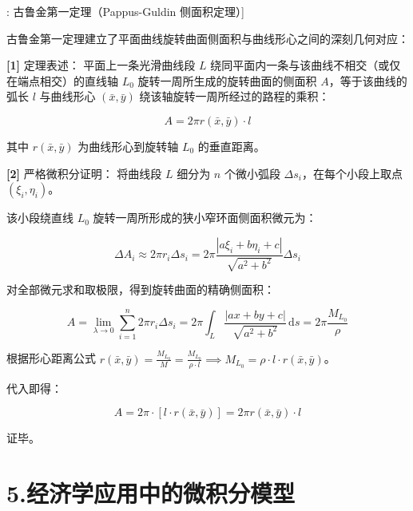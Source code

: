 \documentclass[11pt,a4paper,UTF8]{ctexart}
\begin{document}
\begin{thmbox}[定理[1]: 古鲁金第一定理（Pappus-Guldin 侧面积定理）]

古鲁金第一定理建立了平面曲线旋转曲面侧面积与曲线形心之间的深刻几何对应：

\textbf{[1]} 定理表述：
平面上一条光滑曲线段 $L$ 绕同平面内一条与该曲线不相交（或仅在端点相交）的直线轴 $L_0$ 旋转一周所生成的旋转曲面的侧面积 $A$，等于该曲线的弧长 $l$ 与曲线形心 $(\bar{x}, \bar{y})$ 绕该轴旋转一周所经过的路程的乘积：


\begin{equation*}
A = 2\pi r(\bar{x}, \bar{y}) \cdot l
\end{equation*}


其中 $r(\bar{x}, \bar{y})$ 为曲线形心到旋转轴 $L_0$ 的垂直距离。

\textbf{[2]} 严格微积分证明：
将曲线段 $L$ 细分为 $n$ 个微小弧段 $\Delta s_i$，在每个小段上取点 $(\xi_i, \eta_i)$。

该小段绕直线 $L_0$ 旋转一周所形成的狭小窄环面侧面积微元为：


\begin{equation*}
\Delta A_i \approx 2\pi r_i \Delta s_i = 2\pi \frac{|a \xi_i + b \eta_i + c|}{\sqrt{a^2 + b^2}} \Delta s_i
\end{equation*}


对全部微元求和取极限，得到旋转曲面的精确侧面积：


\begin{equation*}
A = \lim_{\lambda \to 0} \sum_{i=1}^n 2\pi r_i \Delta s_i = 2\pi \int_L \frac{|a x + b y + c|}{\sqrt{a^2 + b^2}}\,\mathrm{d}s = 2\pi \frac{M_{L_0}}{\rho}
\end{equation*}


根据形心距离公式 $r(\bar{x}, \bar{y}) = \frac{M_{L_0}}{M} = \frac{M_{L_0}}{\rho \cdot l} \implies M_{L_0} = \rho \cdot l \cdot r(\bar{x}, \bar{y})$。

代入即得：


\begin{equation*}
A = 2\pi \cdot [l \cdot r(\bar{x}, \bar{y})] = 2\pi r(\bar{x}, \bar{y}) \cdot l
\end{equation*}


证毕。

\end{thmbox}

\section{5.经济学应用中的微积分模型}
\end{document}
